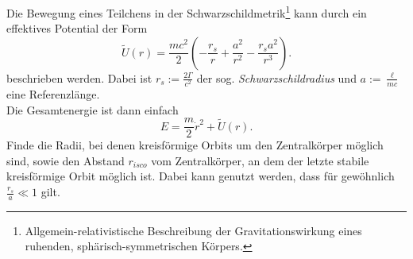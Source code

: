 \begin{Exercise}[label = lso, difficulty = 3, origin = Aaron Wild, title = Schwarzschildmetrik]
	Die Bewegung eines Teilchens in der Schwarzschildmetrik\footnote[3]{Allgemein-relativistische Beschreibung der Gravitationswirkung eines ruhenden, sphärisch-symmetrischen Körpers.} kann durch ein effektives Potential der Form
	\begin{equation}\label{lso:ep}
		\tilde{U}\left(r\right) = \frac{mc^2}{2} \left(-\frac{r_s}{r} + \frac{a^2}{r^2} - \frac{r_sa^2}{r^3}\right).
	\end{equation}
	beschrieben werden. Dabei ist $r_s := \frac{2\Gamma}{c^2}$ der sog. \textit{Schwarzschildradius} und $ a := \frac{\ell}{mc}$ eine Referenzlänge.\\
	Die Gesamtenergie ist dann einfach
	\begin{equation}\label{lso:ene}
		E = \frac{m}{2}\dot{r}^2 + \tilde{U}\left(r\right).
	\end{equation}
	Finde die Radii, bei denen kreisförmige Orbits um den Zentralkörper möglich sind, sowie den Abstand $r_{isco}$ vom Zentralkörper, an dem der letzte stabile kreisförmige Orbit möglich ist. Dabei kann genutzt werden, dass für gewöhnlich $\frac{r_s}{a} \ll 1$ gilt.
\end{Exercise}
